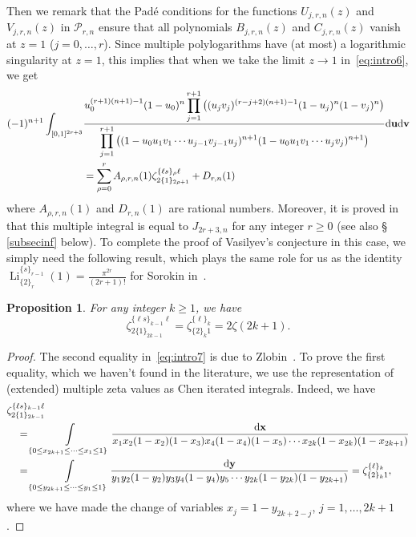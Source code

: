 \documentclass[reqno,12pt]{amsart}
\numberwithin{equation}{section}
\newtheorem{prop}{Proposition}
\theoremstyle{remark}
\def\li{\operatorname{Li}}
\def\dd{\textup{d}}
\newcommand{\Prn}{\mathcal{P}_{r,n}}
\begin{document}
Then we   remark that the  Pad\'e conditions for the functions $U_{j,r,n}(z)$ and $V_{j,r,n}(z)$ in $\Prn$ 
ensure that all  polynomials 
$B_{j,r,n}(z)$ and $C_{j,r,n}(z)$ vanish at $z=1$ ($j=0, \ldots, r$). Since multiple polylogarithms have (at most) a 
logarithmic singularity at $z=1$, this implies that when we take the limit $z\to 1$ in~\eqref{eq:intro6}, we get 
\begin{align*}
(-1)^{n+1} \int_{[0,1]^{2r+3}} &
\frac{\displaystyle u_0^{(r+1)(n+1)-1}(1-u_0)^n \prod_{j=1}^{r+1}\big((u_jv_j)^{(r-j+2)(n+1)-1}(1-u_j)^n(1-v_j)^n\big)}
{\displaystyle \prod_{j=1}^{r+1}\big((1-u_0u_1v_1\cdots u_{j-1}v_{j-1}u_j)^{n+1}(1-u_0u_1v_1\cdots u_{j}v_{j})^{n+1}\big)} 
\dd{\bf u}\dd{\bf v} 
\\
&=\sum_{\rho=0}^r A_{\rho,r,n}(1) \zeta_{2\{1\}_{2\rho+1}}^{\{\ell s\}_\rho\ell} 
+D_{r,n}(1)
\end{align*}
where $A_{\rho,r,n}(1)$ and $D_{r,n}(1)$ are rational numbers. 
Moreover, it is proved in~\cite[Corollaire~8]{fischler2} that  this multiple integral  is equal 
to $J_{2r+3,n}$ for any integer $r\ge 0$ (see also \S~ \ref{subsecinf} below). 
To complete the proof of Vasilyev's   conjecture in this case, we simply need the following 
result, which plays the same role for us as the identity $\li_{\{2\}_{r}}^{\{s\}_{r-1}}(1)=\frac{\pi^{2r}}{(2r+1)!}$ for 
Sorokin in~\cite{sorokin1}.


\begin{prop}\label{prop:3} For any integer $k\ge 1$, we have
\begin{equation}\label{eq:intro7}
\zeta_{2\{1\}_{2k-1}}^{\{\ell s\}_{k-1}\ell}=\zeta_{\{2\}_k 1}^{\{\ell\}_{k}} = 2\zeta(2k+1).
\end{equation}
\end{prop}
\begin{proof}
The second equality in~\eqref{eq:intro7} is due to Zlobin~\cite{zlobin2}.
To prove the first equality, which we haven't found in the literature,
we use the 
representation of (extended) multiple zeta values as Chen iterated integrals. Indeed, 
we have
\begin{align*}
&\zeta_{2\{1\}_{2k-1}}^{\{\ell s\}_{k-1}\ell} 
\\ &\quad=
 \int\limits_{\{0\le x_{2k+1}\le \cdots \le x_1\le 1\}} 
\frac{\dd {\bf x}}{x_1x_2(1-x_2)(1-x_3)x_4(1-x_4)(1-x_5)\cdots x_{2k}(1-x_{2k})(1-x_{2k+1})}
\\
&\quad= \int\limits_{\{0\le y_{2k+1}\le \cdots \le y_1\le 1\}} 
\frac{\dd {\bf y}}{y_1y_2(1-y_2)y_3y_4(1-y_4)y_5\cdots y_{2k}(1-y_{2k})(1-y_{2k+1})}
=\zeta_{\{2\}_k 1}^{\{\ell\}_{k}},
\end{align*}
where we have made the change of variables $x_j=1-y_{2k+2-j}$, $j=1, \ldots, 2k+1$.
\end{proof}
\end{document}
